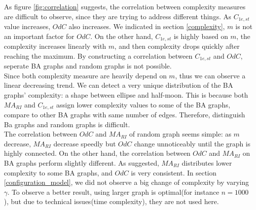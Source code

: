 \documentclass[12pt]{article}
\begin{document}
{\noindent
As figure \ref{fig:correlation} suggests, the correlation between complexity measures are difficult to observe, since they are trying to address different things. As $C_{1e,st}$ value increases, $OdC$ also increases. We indicated in section \ref{complexity}, $m$ is not an important factor for $OdC$. On the other hand, $C_{1e,st}$ is highly based on $m$, the complexity increases linearly with $m$, and then complexity drops quickly after reaching the maximum. By constructing a correlation between $C_{1e,st}$ and $OdC$, seperate BA graphs and random graphs is not possible.\\
Since both complexity measure are heavily depend on $m$, thus we can observe a linear decreasing trend. We can detect a very unique distribution of the BA graphs' complexity: a shape between ellipse and half-moon. This is because both $MA_{RI}$ and $C_{1e,st}$ assign lower complexity values to some of the BA graphs, compare to other BA graphs with same number of edges. Therefore, distinguish Ba graphs and random graphs is difficult.\\
The correlation between $OdC$ and $MA_{RI}$ of random graph seems simple: as $m$ decrease, $MA_{RI}$ decrease speedly but $OdC$ change unnoticeably until the graph is highly connected. On the other hand, the correlation between $OdC$ and $MA_{RI}$ on BA graphs perform slightly different. As suggested, $MA_{RI}$ distributes lower complexity to some BA graphs, and $OdC$ is very consistent. In section \ref{configuration_model}, we did not observe a big change of complexity by varying $\gamma$. To observe a better result, using larger graph is optimal(for instance $n=1000$), but due to technical issues(time complexity), they are not used here.



}
\end{document}
